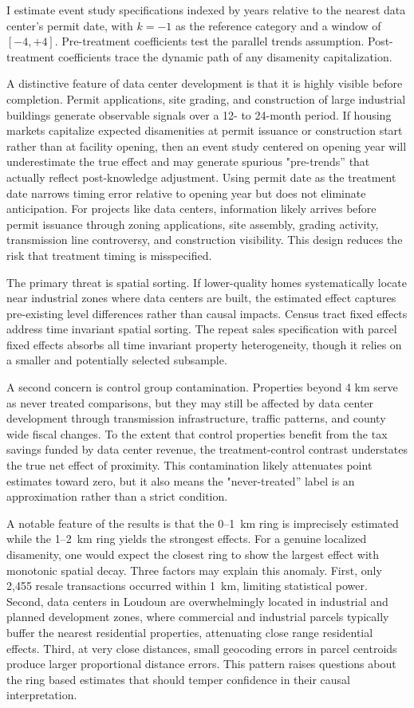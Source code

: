 \documentclass[12pt]{article}
\begin{document}
I estimate event study specifications indexed by years relative to the nearest data center's permit date, with $k = -1$ as the reference category and a window of $[-4, +4]$. Pre-treatment coefficients test the parallel trends assumption. Post-treatment coefficients trace the dynamic path of any disamenity capitalization.

A distinctive feature of data center development is that it is highly visible before completion. Permit applications, site grading, and construction of large industrial buildings generate observable signals over a 12- to 24-month period. If housing markets capitalize expected disamenities at permit issuance or construction start rather than at facility opening, then an event study centered on opening year will underestimate the true effect and may generate spurious "pre-trends'' that actually reflect post-knowledge adjustment. Using permit date as the treatment date narrows timing error relative to opening year but does not eliminate anticipation. For projects like data centers, information likely arrives before permit issuance through zoning applications, site assembly, grading activity, transmission line controversy, and construction visibility. This design reduces the risk that treatment timing is misspecified.

The primary threat is spatial sorting. If lower-quality homes systematically locate near industrial zones where data centers are built, the estimated effect captures pre-existing level differences rather than causal impacts. Census tract fixed effects address time invariant spatial sorting. The repeat sales specification with parcel fixed effects absorbs all time invariant property heterogeneity, though it relies on a smaller and potentially selected subsample.

A second concern is control group contamination. Properties beyond 4 km serve as never treated comparisons, but they may still be affected by data center development through transmission infrastructure, traffic patterns, and county wide fiscal changes. To the extent that control properties benefit from the tax savings funded by data center revenue, the treatment-control contrast understates the true net effect of proximity. This contamination likely attenuates point estimates toward zero, but it also means the "never-treated'' label is an approximation rather than a strict condition.

A notable feature of the results is that the 0--1~km ring is imprecisely estimated while the 1--2~km ring yields the strongest effects. For a genuine localized disamenity, one would expect the closest ring to show the largest effect with monotonic spatial decay. Three factors may explain this anomaly. First, only 2,455 resale transactions occurred within 1~km, limiting statistical power. Second, data centers in Loudoun are overwhelmingly located in industrial and planned development zones, where commercial and industrial parcels typically buffer the nearest residential properties, attenuating close range residential effects. Third, at very close distances, small geocoding errors in parcel centroids produce larger proportional distance errors. This pattern raises questions about the ring based estimates that should temper confidence in their causal interpretation.
\end{document}
